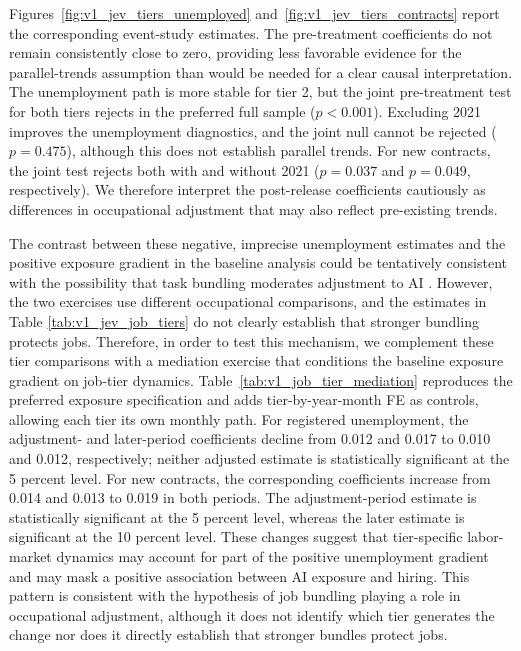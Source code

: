 Figures~\ref{fig:v1_jev_tiers_unemployed} and~\ref{fig:v1_jev_tiers_contracts} report the corresponding event-study estimates. The pre-treatment coefficients do not remain consistently close to zero, providing less favorable evidence for the parallel-trends assumption than would be needed for a clear causal interpretation. The unemployment path is more stable for tier 2, but the joint pre-treatment test for both tiers rejects in the preferred full sample (\(p<0.001\)). Excluding 2021 improves the unemployment diagnostics, and the joint null cannot be rejected (\(p=0.475\)), although this does not establish parallel trends. For new contracts, the joint test rejects both with and without 2021 (\(p=0.037\) and \(p=0.049\), respectively). We therefore interpret the post-release coefficients cautiously as differences in occupational adjustment that may also reflect pre-existing trends.

The contrast between these negative, imprecise unemployment estimates and the positive exposure gradient in the baseline analysis could be tentatively consistent with the possibility that task bundling moderates adjustment to AI \citep{garicano2026weak}. However, the two exercises use different occupational comparisons, and the estimates in Table \ref{tab:v1_jev_job_tiers} do not clearly establish that stronger bundling protects jobs. Therefore, in order to test this mechanism, we complement these tier comparisons with a mediation exercise that conditions the baseline exposure gradient on job-tier dynamics. Table~\ref{tab:v1_job_tier_mediation} reproduces the preferred exposure specification and adds tier-by-year-month FE as controls, allowing each tier its own monthly path. For registered unemployment, the adjustment- and later-period coefficients decline from 0.012 and 0.017 to 0.010 and 0.012, respectively; neither adjusted estimate is statistically significant at the 5 percent level. For new contracts, the corresponding coefficients increase from 0.014 and 0.013 to 0.019 in both periods. The adjustment-period estimate is statistically significant at the 5 percent level, whereas the later estimate is significant at the 10 percent level. These changes suggest that tier-specific labor-market dynamics may account for part of the positive unemployment gradient and may mask a positive association between AI exposure and hiring. This pattern is consistent with the hypothesis of job bundling playing a role in occupational adjustment, although it does not identify which tier generates the change nor does it directly establish that stronger bundles protect jobs.

